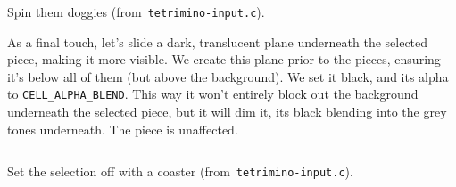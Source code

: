 \begin{listing}[!htbp]
\inputminted[]{C}{code/tetrimino-thread.h}
\caption{Spin them doggies (from~\texttt{tetrimino-input.c}).}
\label{list:tetrimino-thread}
\end{listing}

As a final touch, let's slide a dark, translucent plane underneath the
selected piece, making it more visible. We create this plane prior to the
pieces, ensuring it's below all of them (but above the background). We set it
black, and its alpha to \texttt{CELL\_ALPHA\_BLEND}. This way it won't entirely
block out the background underneath the selected piece, but it will dim it,
its black blending into the grey tones underneath. The piece is unaffected.

\begin{listing}[!htbp]
\inputminted[]{C}{code/tetrimino-box.h}
\caption{Set the selection off with a coaster (from~\texttt{tetrimino-input.c}).}
\label{list:tetrimino-box}
\end{listing}

